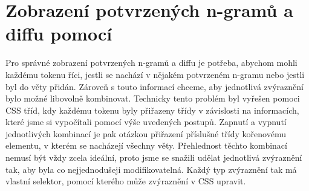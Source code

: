 \begin{figure}[h!]
\centering
{}
\end{figure}


\section{Zobrazení potvrzených n-gramů a diffu pomocí}
Pro správné zobrazení potvrzených n-gramů a diffu je potřeba,
  abychom mohli každému tokenu říci,
  jestli se nachází v nějakém potvrzeném n-gramu nebo jestli byl do věty přidán.
Zároveň s touto informací chceme,
  aby jednotlivá zvýraznění bylo možné libovolně kombinovat.
Technicky tento problém byl vyřešen pomoci CSS tříd,
  kdy každému tokenu byly přiřazeny třídy v závislosti na informacích,
  které jsme si vypočítali pomocí výše uvedených postupů.
Zapnutí a vypnutí jednotlivých kombinací je pak otázkou přiřazení příslušné třídy kořenovému elementu,
  v kterém se nacházejí všechny věty.
Přehlednost těchto kombinací nemusí být vždy zcela ideální, 
  proto jsme se snažili udělat jednotlivá zvýraznění tak,
  aby byla co nejjednodušeji modifikovatelná.
Každý typ zvýraznění tak má vlastní selektor,
  pomocí kterého může zvýraznění v CSS upravit.

